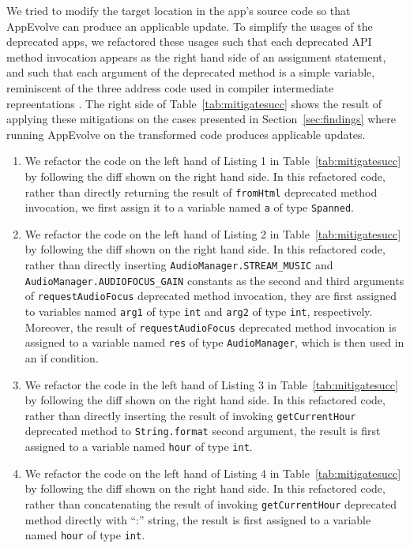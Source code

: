We tried to modify the target location in the app's source code so that
AppEvolve can produce an applicable update. To simplify the usages of the
deprecated apps, we refactored these usages such that each deprecated API
method invocation appears as the right hand side of an assignment
statement, and such that each argument of the deprecated method is a simple
variable, reminiscent of the three address code used in compiler
intermediate repreentations \cite{compiler}.  The right side of
Table~\ref{tab:mitigatesucc} shows the result of applying these mitigations
on the cases presented in Section~\ref{sec:findings} where running
AppEvolve on the transformed code produces applicable updates.

\begin{enumerate}
\item We refactor the code on the left hand of Listing 1 in Table~\ref{tab:mitigatesucc} by following the diff shown on the right hand side. In this refactored code, rather than directly returning the result of {\tt fromHtml} deprecated method invocation, we first assign it to a variable named {\tt a} of type {\tt Spanned}. %

\item We refactor the code on the left hand of Listing 2 in Table~\ref{tab:mitigatesucc} by following the diff shown on the right hand side. In this refactored code, rather than directly inserting {\tt AudioManager.STREAM\_MUSIC} and {\tt AudioManager.AUDIOFOCUS\_GAIN} constants as the second and third arguments of {\tt requestAudioFocus} deprecated method invocation, they are first assigned to variables named {\tt arg1} of type {\tt int} and {\tt arg2} of type {\tt int}, respectively. Moreover, the result of {\tt requestAudioFocus} deprecated method invocation is assigned to a variable  named {\tt res} of type {\tt AudioManager}, which is then used in an if condition.

\item We refactor the code in the left hand of Listing 3 in  Table~\ref{tab:mitigatesucc} by following the diff shown on the right hand side. In this refactored code, rather than directly inserting the result of invoking {\tt getCurrentHour} deprecated method to {\tt String.format} second argument, the result is first assigned to a variable named {\tt hour} of type {\tt int}.

\item We refactor the code on the left hand of Listing 4 in  Table~\ref{tab:mitigatesucc} by following the diff shown on the right hand side. In this refactored code, rather than concatenating the result of invoking {\tt getCurrentHour} deprecated method directly with ``:'' string, the result is first assigned to a variable named {\tt hour} of type {\tt int}.


\end{enumerate}

